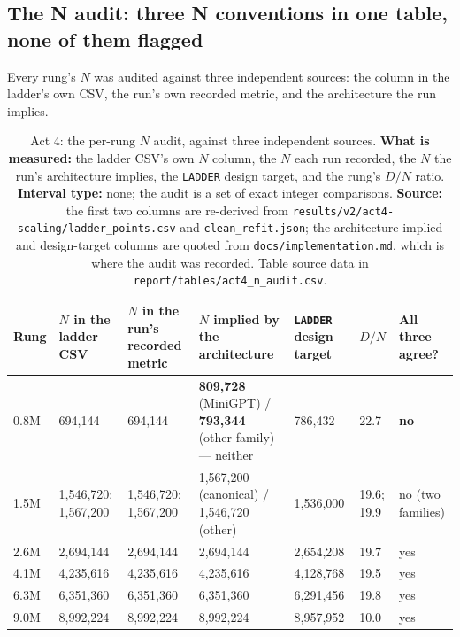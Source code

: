 \documentclass[11pt,a4paper]{article}
\begin{document}
\subsection{The N audit: three N conventions in one table, none of them flagged}
\label{sec:act4-naudit}

Every rung's $N$ was audited against three independent sources: the column in
the ladder's own CSV, the run's own recorded metric, and the architecture the
run implies. %

\begin{table}[H]
\centering
\small
\begin{tabular}{L{1.0cm}R{1.9cm}R{1.9cm}L{3.4cm}R{1.5cm}R{0.9cm}R{1.2cm}}
\toprule
Rung & $N$ in the ladder CSV & $N$ in the run's recorded metric &
$N$ implied by the architecture & \texttt{LADDER} design target & $D/N$ &
All three agree? \\
\midrule
0.8M & 694,144 & 694,144 & \textbf{809,728} (MiniGPT) / \textbf{793,344}
(other family) --- neither & 786,432 & 22.7 & \textbf{no} \\
1.5M & 1,546,720; 1,567,200 & 1,546,720; 1,567,200 & 1,567,200 (canonical) /
1,546,720 (other) & 1,536,000 & 19.6; 19.9 & no (two families) \\
2.6M & 2,694,144 & 2,694,144 & 2,694,144 & 2,654,208 & 19.7 & yes \\
4.1M & 4,235,616 & 4,235,616 & 4,235,616 & 4,128,768 & 19.5 & yes \\
6.3M & 6,351,360 & 6,351,360 & 6,351,360 & 6,291,456 & 19.8 & yes \\
9.0M & 8,992,224 & 8,992,224 & 8,992,224 & 8,957,952 & 10.0 & yes \\
\bottomrule
\end{tabular}
\caption{Act 4: the per-rung $N$ audit, against three independent sources.
\textbf{What is measured:} the ladder CSV's own $N$ column, the $N$ each run
recorded, the $N$ the run's architecture implies, the \texttt{LADDER} design
target, and the rung's $D/N$ ratio. \textbf{Interval type:} none; the audit
is a set of exact integer comparisons. \textbf{Source:} the first two columns
are re-derived from
\texttt{results/v2/act4-scaling/ladder\_points.csv} and
\texttt{clean\_refit.json}; the architecture-implied and design-target columns
are quoted from \texttt{docs/implementation.md}, which is where the audit was
recorded. Table source data in
\texttt{report/tables/act4\_n\_audit.csv}.}
\label{tab:act4-naudit}
\end{table}
\end{document}
